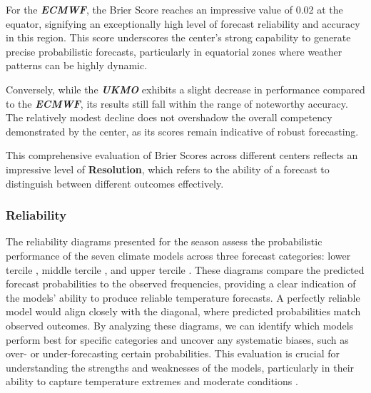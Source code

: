 For the \textbf{\textit{ECMWF}}, the Brier Score reaches an impressive value of 0.02 at the equator, signifying an exceptionally high level of forecast reliability and accuracy in this region. This score underscores the center's strong capability to generate precise probabilistic forecasts, particularly in equatorial zones where weather patterns can be highly dynamic.

Conversely, while the \textbf{\textit{UKMO}} exhibits a slight decrease in performance compared to the \textbf{\textit{ECMWF}}, its results still fall within the range of noteworthy accuracy. The relatively modest decline does not overshadow the overall competency demonstrated by the center, as its scores remain indicative of robust forecasting.

This comprehensive evaluation of Brier Scores across different centers reflects an impressive level of \textbf{Resolution}, which refers to the ability of a forecast to distinguish between different outcomes effectively. 


\subsubsection{Reliability}
The reliability diagrams presented for the season assess the probabilistic performance of the seven climate models across three forecast categories: lower tercile , middle tercile , and upper tercile . These diagrams compare the predicted forecast probabilities to the observed frequencies, providing a clear indication of the models' ability to produce reliable temperature forecasts. A perfectly reliable model would align closely with the diagonal, where predicted probabilities match observed outcomes. By analyzing these diagrams, we can identify which models perform best for specific categories and uncover any systematic biases, such as over- or under-forecasting certain probabilities. This evaluation is crucial for understanding the strengths and weaknesses of the models, particularly in their ability to capture temperature extremes and moderate conditions .


